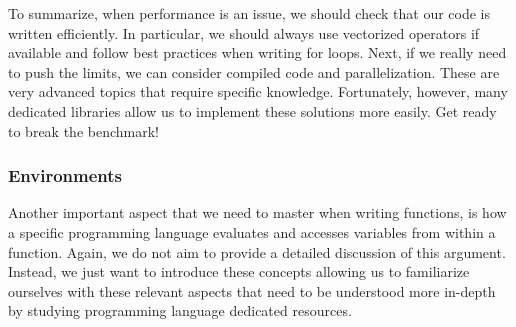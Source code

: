 \documentclass[
  11pt,
]{book}
\begin{document}
To summarize, when performance is an issue, we should check that our code is written efficiently. In particular, we should always use vectorized operators if available and follow best practices when writing for loops. Next, if we really need to push the limits, we can consider compiled code and parallelization. These are very advanced topics that require specific knowledge. Fortunately, however, many dedicated libraries allow us to implement these solutions more easily. Get ready to break the benchmark!

\hypertarget{environments}{%
\subsubsection{Environments}\label{environments}}

Another important aspect that we need to master when writing functions, is how a specific programming language evaluates and accesses variables from within a function. Again, we do not aim to provide a detailed discussion of this argument. Instead, we just want to introduce these concepts allowing us to familiarize ourselves with these relevant aspects that need to be understood more in-depth by studying programming language dedicated resources.
\end{document}
